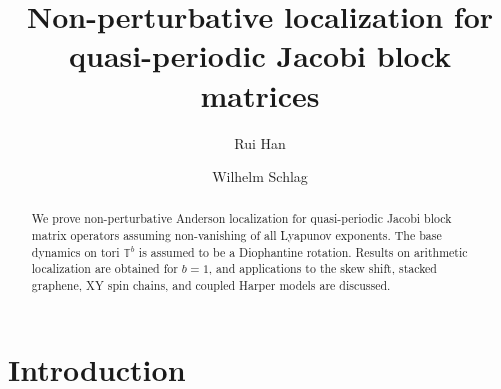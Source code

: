 \documentclass[11pt]{amsart}
\title[Localization for quasi-periodic block matrices]{Non-perturbative localization for quasi-periodic Jacobi block matrices}
\author[R.\ Han]{Rui Han}
\author[W.\ Schlag]{Wilhelm Schlag}
\def\tor{\mathbb{T}}
\begin{document}
\begin{abstract}
We prove non-perturbative Anderson localization for quasi-periodic Jacobi block matrix operators assuming non-vanishing of all Lyapunov exponents. The base dynamics on tori $\tor^b$ is assumed to be a Diophantine rotation. Results on arithmetic localization are obtained for $b=1$, and applications to the skew shift, stacked graphene, XY spin chains, and coupled Harper models are discussed.  
\end{abstract}

\maketitle
\tableofcontents

\section{Introduction}
\end{document}
